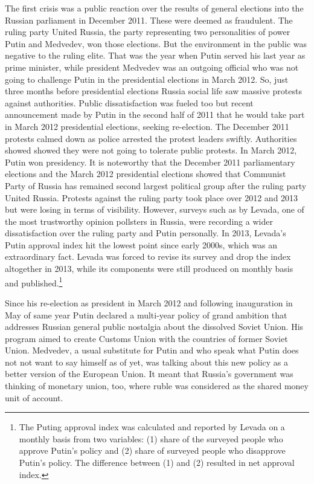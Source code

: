 The first crisis was a public reaction over the results of general
elections into the Russian parliament in December 2011. These were
deemed as fraudulent. The ruling party United Russia, the party
representing two personalities of power Putin and Medvedev, won those
elections. But the environment in the public was negative to the ruling
elite. That was the year when Putin served his last year as prime
minister, while president Medvedev was an outgoing official who was not
going to challenge Putin in the presidential elections in March 2012.
So, just three months before presidential elections Russia social life
saw massive protests against authorities. Public dissatisfaction was
fueled too but recent announcement made by Putin in the second half of
2011 that he would take part in March 2012 presidential elections,
seeking re-election. The December 2011 protests calmed down as police
arrested the protest leaders swiftly. Authorities showed showed they
were not going to tolerate public protests. In March 2012, Putin won
presidency. It is noteworthy that the December 2011 parliamentary
elections and the March 2012 presidential elections showed that
Communist Party of Russia has remained second largest political group
after the ruling party United Russia. Protests against the ruling party
took place over 2012 and 2013 but were losing in terms of visibility.
However, surveys such as by Levada, one of the most trustworthy opinion
pollsters in Russia, were recording a wider dissatisfaction over the
ruling party and Putin personally. In 2013, Levada's Putin approval
index hit the lowest point since early 2000s, which was an extraordinary
fact. Levada was forced to revise its survey and drop the index
altogether in 2013, while its components were still produced on monthly
basis and published.\footnote{The Puting approval index was calculated and reported by Levada
    on a monthly basis from two variables: (1) share of the surveyed
    people who approve Putin's policy and (2) share of surveyed people
    who disapprove Putin's policy. The difference between (1) and (2)
    resulted in net approval index.}

Since his re-election as president in March 2012 and following
inauguration in May of same year Putin declared a multi-year policy of
grand ambition that addresses Russian general public nostalgia about the
dissolved Soviet Union. His program aimed to create Customs Union with
the countries of former Soviet Union. Medvedev, a usual substitute for
Putin and who speak what Putin does not not want to say himself as of
yet, was talking about this new policy as a better version of the
European Union. It meant that Russia's government was thinking of
monetary union, too, where ruble was considered as the shared money unit
of account.

